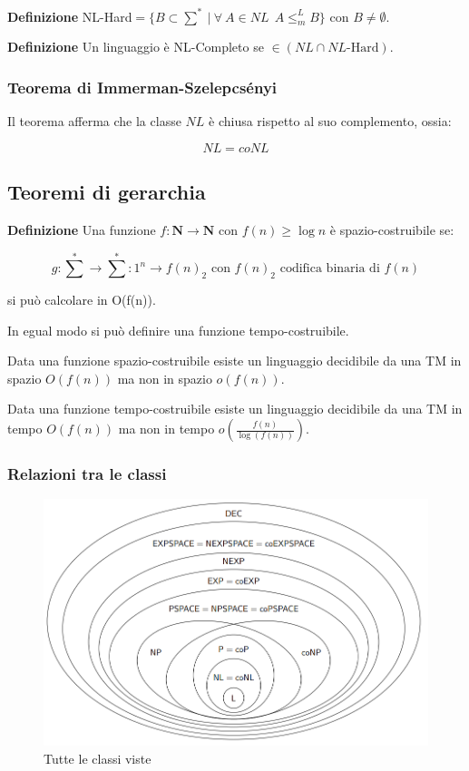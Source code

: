 \documentclass{article}
\begin{document}
\textbf{Definizione} NL-Hard$=\{B\subset\sum^*\ |\ \forall\ A\in NL\ \ A\leq_m^L B\}$ con $B\neq\emptyset$.\newline

\noindent\textbf{Definizione} Un linguaggio è NL-Completo se $\in(NL\cap NL\text{-Hard})$.\newline

\subsubsection{Teorema di Immerman-Szelepcsényi}

Il teorema afferma che la classe $NL$ è chiusa rispetto al suo complemento, ossia:

$$NL=coNL$$\newline

\subsection{Teoremi di gerarchia}

\textbf{Definizione} Una funzione $f:\mathbf{N}\rightarrow\mathbf{N}$ con $f(n)\geq \log n$ è spazio-costruibile se:

$$g:{\sum}^*\rightarrow{\sum}^*:1^n\rightarrow f(n)_2 \text{ con $f(n)_2$ codifica binaria di $f(n)$}$$\newline

\noindent si può calcolare in O(f(n)).\newline

\noindent In egual modo si può definire una funzione tempo-costruibile.\newline

\noindent Data una funzione spazio-costruibile esiste un linguaggio decidibile da una TM in spazio $O(f(n))$ ma non in spazio $o(f(n))$.\newline

\noindent Data una funzione tempo-costruibile esiste un linguaggio decidibile da una TM in tempo $O(f(n))$ ma non in tempo $o(\frac{f(n)}{\log(f(n))})$.\newline

\newpage

\subsubsection{Relazioni tra le classi}

\begin{figure}[ht]
    \centering
    \includegraphics[width=\linewidth]{classi.png}
    \caption{Tutte le classi viste}
    \label{fig:classi}
\end{figure}
\end{document}

